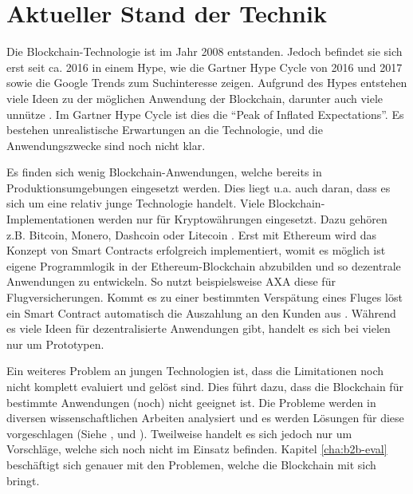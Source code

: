 \chapter{Aktueller Stand der Technik}
\label{cha:stand-technik}

Die Blockchain-Technologie ist im Jahr 2008 entstanden. Jedoch befindet sie sich erst seit ca. 2016 in einem Hype, wie die Gartner Hype Cycle von 2016 und 2017 \cite{PanettaTopTrendsGartner2017}\cite{AmyGartner2016Hype2016} sowie die Google Trends zum Suchinteresse \cite{GoogleBlockchainGoogleTrends18} zeigen. Aufgrund des Hypes entstehen viele Ideen zu der möglichen Anwendung der Blockchain, darunter auch viele unnütze \cite{WustyouneedBlockchain2017}. Im Gartner Hype Cycle ist dies die ``Peak of Inflated Expectations''. Es bestehen unrealistische Erwartungen an die Technologie, und die Anwendungszwecke sind noch nicht klar. 

Es finden sich wenig Blockchain-Anwendungen, welche bereits in Produktionsumgebungen eingesetzt werden. Dies liegt u.a. auch daran, dass es sich um eine relativ junge Technologie handelt. Viele Blockchain-Implementationen werden nur für Kryptowährungen eingesetzt. Dazu gehören z.B. Bitcoin, Monero, Dashcoin oder Litecoin \cite{BlockchainHubBlockchainsDistributedLedger}. Erst mit Ethereum wird das Konzept von Smart Contracts erfolgreich implementiert, womit es möglich ist eigene Programmlogik in der Ethereum-Blockchain abzubilden und so dezentrale Anwendungen zu entwickeln. So nutzt beispielsweise AXA diese für Flugversicherungen. Kommt es zu einer bestimmten Verspätung eines Fluges löst ein Smart Contract automatisch die Auszahlung an den Kunden aus \cite{BoerAXAnutztEthereumBlockchain2017}. Während es viele Ideen für dezentralisierte Anwendungen gibt, handelt es sich bei vielen nur um Prototypen.

Ein weiteres Problem an jungen Technologien ist, dass die Limitationen noch nicht komplett evaluiert und gelöst sind. Dies führt dazu, dass die Blockchain für bestimmte Anwendungen (noch) nicht geeignet ist. Die Probleme werden in diversen wissenschaftlichen Arbeiten analysiert und es werden Lösungen für diese vorgeschlagen (Siehe \cite{ZhengBlockchainChallengesOpportunities2017}, \cite{SwanBlockchainblueprintnew2015} und \cite{SchererPerformanceScalabilityBlockchain2017}). Tweilweise handelt es sich jedoch nur um Vorschläge, welche sich noch nicht im Einsatz befinden. Kapitel \ref{cha:b2b-eval} beschäftigt sich genauer mit den Problemen, welche die Blockchain mit sich bringt.

